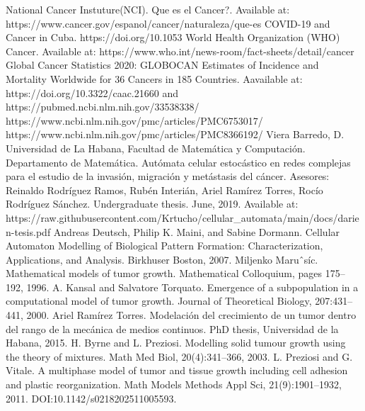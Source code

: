 
\printbibliography[heading=bibintoc]
\begin{thebibliography}{99}

\vskip 0.2cm
National Cancer Instuture(NCI). Que es el Cancer?. Available at: https://www.cancer.gov/espanol/cancer/naturaleza/que-es
\vskip 0.2cm
 COVID-19 and Cancer in Cuba. https://doi.org/10.1053%
\vskip 0.2cm
World Health Organization (WHO) Cancer. Available at: https://www.who.int/news-room/fact-sheets/detail/cancer
\vskip 0.2cm
Global Cancer Statistics 2020: GLOBOCAN Estimates of Incidence and Mortality Worldwide for 36 Cancers in 185 Countries. Aavailable at: https://doi.org/10.3322/caac.21660 and https://pubmed.ncbi.nlm.nih.gov/33538338/
\vskip 0.2cm
https://www.ncbi.nlm.nih.gov/pmc/articles/PMC6753017/
\vskip 0.2cm
https://www.ncbi.nlm.nih.gov/pmc/articles/PMC8366192/
\vskip 0.2cm
Viera Barredo, D. Universidad de La Habana, Facultad de Matemática y Computación. Departamento de Matemática. Autómata celular estocástico en redes complejas para el estudio de la invasión, migración y metástasis del cáncer. Asesores: Reinaldo Rodríguez Ramos, Rubén Interián, Ariel Ramírez Torres, Rocío Rodríguez Sánchez. Undergraduate thesis. June, 2019. Available at: https://raw.githubusercontent.com/Krtucho/cellular\_automata/main/docs/darien-tesis.pdf
\vskip 0.2cm
Andreas Deutsch, Philip K. Maini, and Sabine Dormann. Cellular Automaton Modelling of Biological Pattern Formation: Characterization, Applications, and Analysis. Birkhuser Boston, 2007.
\vskip 0.2cm
Miljenko Maruˆs\'ic. Mathematical models of tumor growth. Mathematical Colloquium, pages 175–192, 1996.
\vskip 0.2cm
A. Kansal and Salvatore Torquato. Emergence of a subpopulation in a computational model of tumor growth. Journal of Theoretical Biology, 207:431–441, 2000.
\vskip 0.2cm
Ariel Ram\'irez Torres. Modelaci\'on del crecimiento de un tumor dentro del rango de la mec\'anica de medios continuos. PhD thesis, Universidad de la Habana, 2015.
\vskip 0.2cm
H. Byrne and L. Preziosi. Modelling solid tumour growth using the theory of mixtures. Math Med Biol, 20(4):341–366, 2003.
\vskip 0.2cm
L. Preziosi and G. Vitale. A multiphase model of tumor and tissue growth including cell adhesion and plastic reorganization. Math Models Methods Appl Sci, 21(9):1901–1932, 2011. DOI:10.1142/s0218202511005593.

\end{thebibliography}
